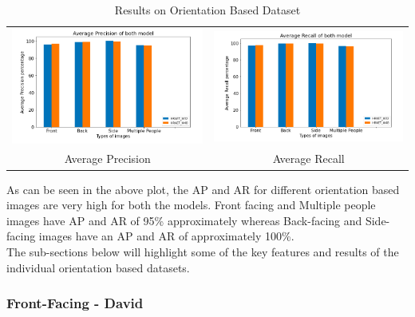 \documentclass[a4paper,12pt]{article}
\begin{document}
\begin{table}[h]
\begin{tabular}{cc}
\includegraphics[scale=0.3]{AP1.png}
&
\includegraphics[scale=0.3]{AR1.png}
\\
Average Precision & Average Recall
\end{tabular}
\caption{Results on Orientation Based Dataset}
\label{tab:caption}
\end{table}

As can be seen in the above plot, the AP and AR for different orientation based images are very high for both the models. Front facing and Multiple people images have AP and AR of 95\% approximately whereas Back-facing and Side-facing images have an AP and AR of approximately 100\%.
\\
The sub-sections below will highlight some of the key features and results of the individual orientation based datasets.

\subsubsection{Front-Facing - David}
\end{document}
